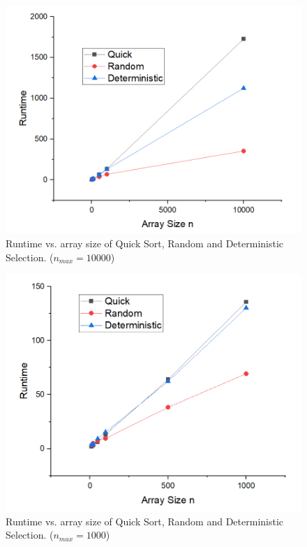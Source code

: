 \documentclass[a4paper]{article}
\begin{document}
\begin{figure}[htbp]
\centering
\includegraphics[scale=0.6]{f4.png}
\caption{Runtime vs. array size of Quick Sort, Random and Deterministic Selection. ($n_{max}=10000$)}
\end{figure}
\begin{figure}[htbp]
\centering
\includegraphics[scale=0.6]{f2.png}
\caption{Runtime vs. array size of Quick Sort, Random and Deterministic Selection. ($n_{max}=1000$)}
\end{figure}
\end{document}
